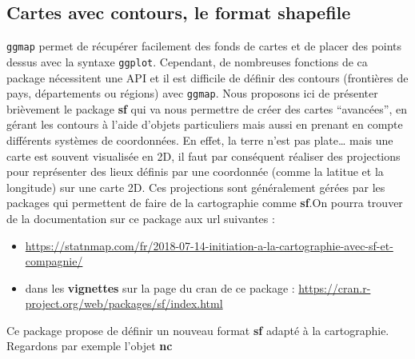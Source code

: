 \documentclass[]{article}
\providecommand{\tightlist}{%
  \setlength{\itemsep}{0pt}\setlength{\parskip}{0pt}}
\theoremstyle{definition}
\theoremstyle{definition}
\theoremstyle{definition}
\theoremstyle{remark}
\begin{document}
\hypertarget{cartes-avec-contours-le-format-shapefile}{%
\subsection{Cartes avec contours, le format shapefile}\label{cartes-avec-contours-le-format-shapefile}}

\texttt{ggmap} permet de récupérer facilement des fonds de cartes et de placer des points dessus avec la syntaxe \texttt{ggplot}. Cependant, de nombreuses fonctions de ca package nécessitent une API et il est difficile de définir des contours (frontières de pays, départements ou régions) avec \texttt{ggmap}. Nous proposons ici de présenter brièvement le package \textbf{sf} qui va nous permettre de créer des cartes ``avancées'', en gérant les contours à l'aide d'objets particuliers mais aussi en prenant en compte différents systèmes de coordonnées. En effet, la terre n'est pas plate\ldots{} mais une carte est souvent visualisée en 2D, il faut par conséquent réaliser des projections pour représenter des lieux définis par une coordonnée (comme la latitue et la longitude) sur une carte 2D. Ces projections sont généralement gérées par les packages qui permettent de faire de la cartographie comme \textbf{sf}.On pourra trouver de la documentation sur ce package aux url suivantes :

\begin{itemize}
\tightlist
\item
  \url{https://statnmap.com/fr/2018-07-14-initiation-a-la-cartographie-avec-sf-et-compagnie/}
\item
  dans les \textbf{vignettes} sur la page du cran de ce package : \url{https://cran.r-project.org/web/packages/sf/index.html}
\end{itemize}

Ce package propose de définir un nouveau format \textbf{sf} adapté à la cartographie. Regardons par exemple l'objet \textbf{nc}
\end{document}
